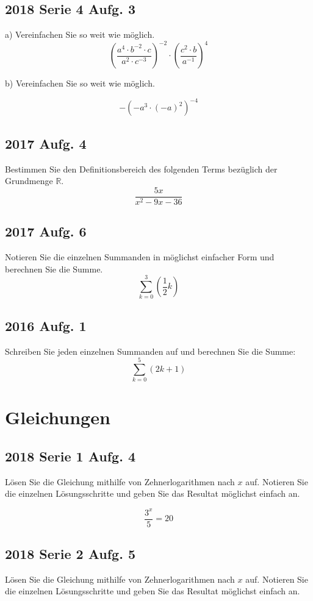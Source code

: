   \subsection{2018 Serie 4 Aufg. 3}
  a) Vereinfachen Sie so weit wie möglich.
  $$\left( \frac{a^4\cdot{} b^{-2}\cdot{} c}{a^2 \cdot{} c^{-3}} \right)^{-2}
  \cdot{}
  \left(\frac{c^2\cdot{}b}{a^{-1}} \right)^4$$ %


  b) Vereinfachen Sie so weit wie möglich.

  $$-\left(  -a^3 \cdot (-a)^2  \right)^{-4}$$

  \subsection{2017 Aufg. 4}
  Bestimmen Sie den Definitionsbereich des folgenden Terms bezüglich
  der Grundmenge $\mathbb{R}$.
  $$\frac{5x}{x^2 -9x - 36}$$

  \subsection{2017 Aufg. 6}
  Notieren Sie die einzelnen Summanden in möglichst einfacher Form und berechnen Sie die
  Summe.
  $$\sum_{k=0}^{3}\left(\frac{1}{2}k\right)$$




  \subsection{2016 Aufg. 1}
  Schreiben Sie jeden einzelnen Summanden auf und berechnen Sie die
  Summe:
  $$\sum_{k=0}^{5}(2k+1)$$



  \section{Gleichungen}
  
\subsection{2018 Serie 1 Aufg. 4}

Lösen Sie die Gleichung mithilfe von Zehnerlogarithmen nach $x$ auf.
Notieren Sie die einzelnen Lösungsschritte und geben Sie das Resultat
möglichst einfach an.

$$\frac{3^x}{5} = 20$$


\subsection{2018 Serie 2 Aufg. 5}
Lösen Sie die Gleichung mithilfe von Zehnerlogarithmen nach $x$ auf.
Notieren Sie die einzelnen Lösungsschritte und geben Sie das Resultat
möglichst einfach an.

